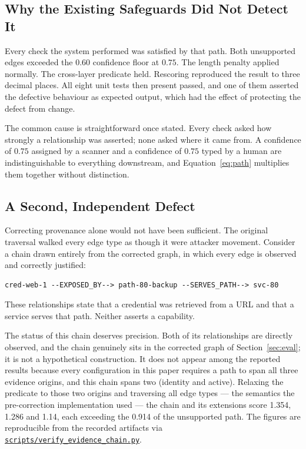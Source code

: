\documentclass[11pt,a4paper]{article}
\begin{document}
\subsection{Why the Existing Safeguards Did Not Detect It}
Every check the system performed was satisfied by that path. Both unsupported edges exceeded the $0.60$ confidence floor at $0.75$. The length penalty applied normally. The cross-layer predicate held. Rescoring reproduced the result to three decimal places. All eight unit tests then present passed, and one of them asserted the defective behaviour as expected output, which had the effect of protecting the defect from change.

The common cause is straightforward once stated. Every check asked how strongly a relationship was asserted; none asked where it came from. A confidence of $0.75$ assigned by a scanner and a confidence of $0.75$ typed by a human are indistinguishable to everything downstream, and Equation~\eqref{eq:path} multiplies them together without distinction.

\subsection{A Second, Independent Defect}
Correcting provenance alone would not have been sufficient. The original traversal walked every edge type as though it were attacker movement. Consider a chain drawn entirely from the corrected graph, in which every edge is observed and correctly justified:
\begin{verbatim}
cred-web-1 --EXPOSED_BY--> path-80-backup --SERVES_PATH--> svc-80
\end{verbatim}
These relationships state that a credential was retrieved from a URL and that a service serves that path. Neither asserts a capability.

The status of this chain deserves precision. Both of its relationships are directly observed, and the chain genuinely sits in the corrected graph of Section~\ref{sec:eval}; it is not a hypothetical construction. It does not appear among the reported results because every configuration in this paper requires a path to span all three evidence origins, and this chain spans two (identity and active). Relaxing the predicate to those two origins and traversing all edge types --- the semantics the pre-correction implementation used --- the chain and its extensions score 1.354, 1.286 and 1.14, each exceeding the 0.914 of the unsupported path. The figures are reproducible from the recorded artifacts via \href{scripts/verify_evidence_chain.py}{\texttt{scripts/verify\_evidence\_chain.py}}.
\end{document}
